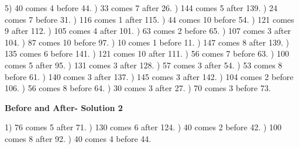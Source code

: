 \documentclass{article}%
\begin{document}
5) 40 comes 4 before 44.%
) 33 comes 7 after 26.%
) 144 comes 5 after 139.%
) 24 comes 7 before 31.%
) 116 comes 1 after 115.%
) 44 comes 10 before 54.%
) 121 comes 9 after 112.%
) 105 comes 4 after 101.%
) 63 comes 2 before 65.%
) 107 comes 3 after 104.%
) 87 comes 10 before 97.%
) 10 comes 1 before 11.%
) 147 comes 8 after 139.%
) 135 comes 6 before 141.%
) 121 comes 10 after 111.%
) 56 comes 7 before 63.%
) 100 comes 5 after 95.%
) 131 comes 3 after 128.%
) 57 comes 3 after 54.%
) 53 comes 8 before 61.%
) 140 comes 3 after 137.%
) 145 comes 3 after 142.%
) 104 comes 2 before 106.%
) 56 comes 8 before 64.%
) 30 comes 3 after 27.%
) 70 comes 3 before 73.%
\newline%
\newpage%
\large%
\begin{center}%
\textbf{Before and After- Solution 2}%
\newline%
\end{center} \normalsize%
1) 76 comes 5 after 71.%
) 130 comes 6 after 124.%
) 40 comes 2 before 42.%
) 100 comes 8 after 92.%
) 40 comes 4 before 44.%
\newline%
\end{document}
